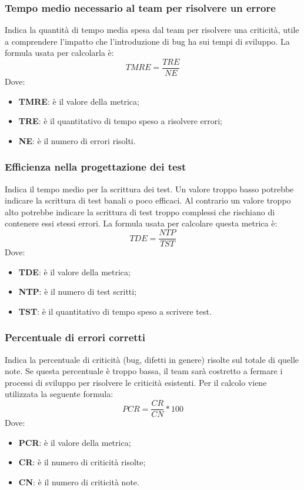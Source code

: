 \subsubsection{Tempo medio necessario al team per risolvere un errore}
Indica la quantità di tempo media spesa dal team per risolvere una criticità, utile a comprendere
l'impatto che l'introduzione di bug ha sui tempi di sviluppo. La formula usata per calcolarla è:
$$TMRE=\frac{TRE}{NE}$$
Dove:
\begin{itemize}
	\item{\textbf{TMRE}: è il valore della metrica;}
	\item{\textbf{TRE}: è il quantitativo di tempo speso a risolvere errori;}
	\item{\textbf{NE}: è il numero di errori risolti.}
\end{itemize}

\subsubsection{Efficienza nella progettazione dei test}
Indica il tempo medio per la scrittura dei test. Un valore troppo basso potrebbe indicare la scrittura di test banali o poco efficaci.
Al contrario un valore troppo alto potrebbe indicare la scrittura di test troppo complessi che rischiano di contenere essi stessi errori.
La formula usata per calcolare questa metrica è:
$$TDE=\frac{NTP}{TST}$$
Dove:
\begin{itemize}
	\item{\textbf{TDE}: è il valore della metrica;}
	\item{\textbf{NTP}: è il numero di test scritti;}
	\item{\textbf{TST}: è il quantitativo di tempo speso a scrivere test.}
\end{itemize}

\subsubsection{Percentuale di errori corretti} \Spazio
Indica la percentuale di criticità (bug, difetti in genere) risolte sul totale di quelle note.
Se questa percentuale è troppo bassa, il team sarà costretto a fermare i processi di sviluppo per risolvere le criticità esistenti.
Per il calcolo viene utilizzata la seguente formula:
$$PCR=\frac{CR}{CN}*100$$
Dove:
\begin{itemize}
	\item{\textbf{PCR}: è il valore della metrica;}
	\item{\textbf{CR}: è il numero di criticità risolte;}
	\item{\textbf{CN}: è il numero di criticità note.}
\end{itemize}

